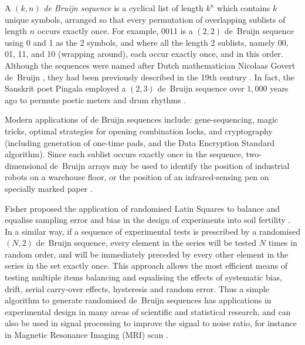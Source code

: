 \documentclass[preprint,times]{elsarticle}
\begin{document}

A $(k,n)$ \emph{de Bruijn sequence\/} is a cyclical list of length $k^n$ which contains $k$ unique symbols, arranged so that every permutation of overlapping sublists of length $n$ occurs exactly once. For example, 0011 is a $(2,2)$ de~Bruijn sequence using 0 and 1 as the 2 symbols, and where all the length 2 sublists, namely 00, 01, 11, and 10 (wrapping around), each occur exactly once, and in this order.
Although the sequences were named after Dutch mathematician Nicolaas Govert de~Bruijn \cite{debruijn}, %
they had been previously described in the  19th century \cite{fleury,sainte-marie}.
In fact, the Sanskrit poet Pingala employed a $(2,3)$ de~Bruijn sequence over $1,000$ years ago to permute poetic meters and drum rhythms \cite{hall,knuth4a}. 

Modern applications of de Bruijn sequences include: gene-sequencing, magic tricks, optimal strategies for opening combination locks, and cryptography (including generation of one-time pads, and the Data Encryption Standard algorithm). Since each sublist occurs exactly once in the sequence, two-dimensional de~Bruijn arrays may be used to identify the position of industrial robots on a warehouse floor, or the position of an infrared-sensing pen on specially marked paper \cite{diaconis}.

Fisher proposed the application of randomised Latin Squares to balance and equalise sampling error and bias in the design of experiments into soil fertility \cite{fisher}. 
In a similar way, if a sequence of experimental tests is prescribed by a randomised $(N,2)$ de~Bruijn sequence, every element in the series will be tested $N$ times in random order, and will be immediately preceded by every other element in the series in the set exactly once. This approach allows the most efficient means of testing multiple items balancing and equalising the effects of systematic bias, drift, serial carry-over effects, hysteresis and random error. Thus a simple algorithm to generate randomised de~Bruijn sequences has applications in experimental design in many areas of scientific and statistical research,  and can also be used in signal processing to improve the signal to noise ratio, for instance in Magnetic Resonance Imaging (MRI) scan \cite{aguirre}.
\end{document}
